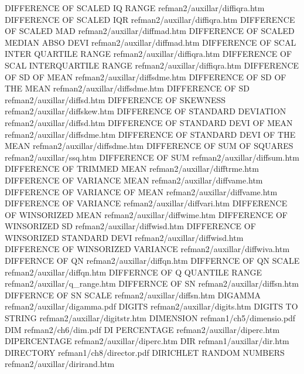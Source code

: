 DIFFERENCE OF SCALED IQ RANGE           refman2/auxillar/diffiqra.htm
DIFFERENCE OF SCALED IQR                refman2/auxillar/diffiqra.htm
DIFFERENCE OF SCALED MAD                refman2/auxillar/diffmad.htm
DIFFERENCE OF SCALED MEDIAN ABSO DEVI   refman2/auxillar/diffmad.htm
DIFFERENCE OF SCAL INTER QUARTILE RANGE refman2/auxillar/diffiqra.htm
DIFFERENCE OF SCAL INTERQUARTILE RANGE  refman2/auxillar/diffiqra.htm
DIFFERENCE OF SD OF MEAN                refman2/auxillar/diffsdme.htm
DIFFERENCE OF SD OF THE MEAN            refman2/auxillar/diffsdme.htm
DIFFERENCE OF SD                        refman2/auxillar/diffsd.htm
DIFFERENCE OF SKEWNESS                  refman2/auxillar/diffskew.htm
DIFFERENCE OF STANDARD DEVIATION        refman2/auxillar/diffsd.htm
DIFFERENCE OF STANDARD DEVI OF MEAN     refman2/auxillar/diffsdme.htm
DIFFERENCE OF STANDARD DEVI OF THE MEAN refman2/auxillar/diffsdme.htm
DIFFERENCE OF SUM OF SQUARES            refman2/auxillar/ssq.htm
DIFFERENCE OF SUM                       refman2/auxillar/diffsum.htm
DIFFERENCE OF TRIMMED MEAN              refman2/auxillar/difftrme.htm
DIFFERENCE OF VARIANCE MEAN             refman2/auxillar/diffvame.htm
DIFFERENCE OF VARIANCE OF MEAN          refman2/auxillar/diffvame.htm
DIFFERENCE OF VARIANCE                  refman2/auxillar/diffvari.htm
DIFFERENCE OF WINSORIZED MEAN           refman2/auxillar/diffwime.htm
DIFFERENCE OF WINSORIZED SD             refman2/auxillar/diffwisd.htm
DIFFERENCE OF WINSORIZED STANDARD DEVI  refman2/auxillar/diffwisd.htm
DIFFERENCE OF WINSORIZED VARIANCE       refman2/auxillar/diffwiva.htm
DIFFERNCE OF QN                         refman2/auxillar/diffqn.htm
DIFFERNCE OF QN SCALE                   refman2/auxillar/diffqn.htm
DIFFERNCE OF Q QUANTILE RANGE           refman2/auxillar/q_range.htm
DIFFERNCE OF SN                         refman2/auxillar/diffsn.htm
DIFFERNCE OF SN SCALE                   refman2/auxillar/diffsn.htm
DIGAMMA                                 refman2/auxillar/digamma.pdf
DIGITS                                  refman2/auxillar/digits.htm
DIGITS TO STRING                        refman2/auxillar/digitstr.htm
DIMENSION                               refman1/ch5/dimensio.pdf
DIM                                     refman2/ch6/dim.pdf
DI PERCENTAGE                           refman2/auxillar/diperc.htm
DIPERCENTAGE                            refman2/auxillar/diperc.htm
DIR                                     refman1/auxillar/dir.htm
DIRECTORY                               refman1/ch8/director.pdf
DIRICHLET RANDOM NUMBERS                refman2/auxillar/dirirand.htm
